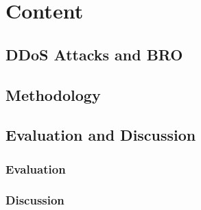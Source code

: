 \section{Content}
\label{section:content}

\subsection{DDoS Attacks and BRO}\label{subsec:ddos-and-bro}

\subsection{Methodology}\label{subsec:methodology}

\subsection{Evaluation and Discussion}\label{subsec:evaluation-discussion}
\subsubsection{Evaluation}\label{subsubsec:evalutation}
\subsubsection{Discussion}\label{subsubsec:discussion}
